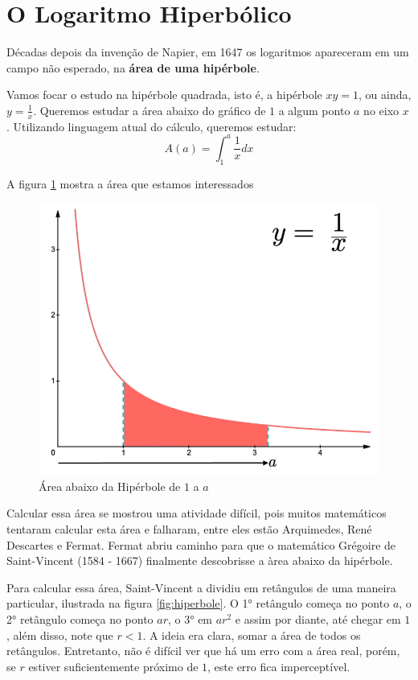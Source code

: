 \section{O Logaritmo Hiperbólico}

Décadas depois da invenção de Napier, em 1647 os logaritmos apareceram em um campo não esperado, na \textbf{área de uma hipérbole}.

Vamos focar o estudo na hipérbole quadrada, isto é, a hipérbole $xy = 1$, ou ainda, $y = \frac{1}{x}$. Queremos estudar a área abaixo do gráfico de $1$ a algum ponto $a$ no eixo $x$. Utilizando linguagem atual do cálculo, queremos estudar:
\[
A(a) = \int_1^a \frac{1}{x} dx
\]

A figura \ref{fig:abaixohiperbole} mostra a área que estamos interessados 

\begin{figure}[H]
    \centering
    \includegraphics[width=0.5\linewidth]{img/areaabaixohip.png}
    \caption{Área abaixo da Hipérbole de $1$ a $a$}
    \label{fig:abaixohiperbole}
\end{figure}

Calcular essa área se mostrou uma atividade difícil, pois muitos matemáticos tentaram calcular esta área e falharam, entre eles estão Arquimedes, René Descartes e Fermat. Fermat abriu caminho para que o matemático Grégoire de Saint-Vincent (1584 - 1667) finalmente descobrisse a àrea abaixo da hipérbole.

Para calcular essa área, Saint-Vincent a dividiu em retângulos de uma maneira particular, ilustrada na figura \ref{fig:hiperbole}.
O 1° retângulo começa no ponto $a$, o 2° retângulo começa no ponto $ar$, o 3° em $ar^2$ e assim por diante, até chegar em $1$, além disso, note que $r < 1$. A ideia era clara, somar a área de todos os retângulos. Entretanto, não é difícil ver que há um erro com a área real, porém, se $r$ estiver suficientemente próximo de $1$, este erro fica imperceptível.

